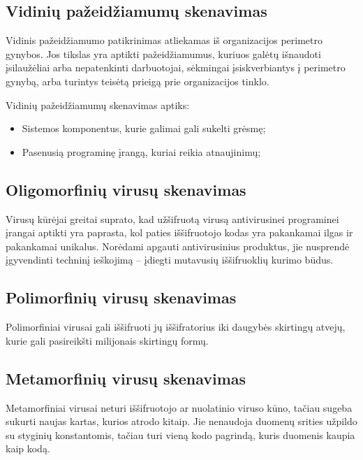 \documentclass[a4paper,12pt,fleqn]{article}
\begin{document}
\subsection{Vidinių pažeidžiamumų skenavimas}
\label{sec:example}

Vidinis pažeidžiamumo patikrinimas atliekamas iš organizacijos perimetro gynybos. Jos tikslas yra aptikti pažeidžiamumus, kuriuos galėtų išnaudoti įsilaužėliai arba nepatenkinti darbuotojai, sėkmingai įsiskverbiantys į perimetro gynybą, arba turintys teisėtą prieigą prie organizacijos tinklo\cite{asbjornslett1999assess}.

Vidinių pažeidžiamumų skenavimas aptiks:
\begin{itemize}
	\item Sistemos komponentus, kurie galimai gali sukelti grėsmę;
	\item Pasenusią programinę įrangą, kuriai reikia atnaujinimų;
\end{itemize}



\subsection{Oligomorfinių virusų skenavimas}
\label{sec:example}

Virusų kūrėjai greitai suprato, kad užšifruotą virusą antivirusinei programinei įrangai aptikti yra paprasta, kol paties iššifruotojo kodas yra pakankamai ilgas ir pakankamai unikalus. Norėdami apgauti antivirusinius produktus, jie nusprendė įgyvendinti techninį ieškojimą – įdiegti mutavusių iššifruoklių kurimo būdus\cite{Szor:2005:ACV:1050957}. 

\subsection{Polimorfinių virusų skenavimas}
\label{sec:example}

Polimorfiniai virusai gali iššifruoti jų iššifratorius iki daugybės skirtingų atvejų, kurie gali pasireikšti milijonais skirtingų formų\cite{Szor:2005:ACV:1050957}. 

\subsection{Metamorfinių virusų skenavimas}
\label{sec:example}

Metamorfiniai virusai neturi iššifruotojo ar nuolatinio viruso kūno, tačiau sugeba sukurti naujas kartas, kurios atrodo kitaip. Jie nenaudoja duomenų srities užpildo su styginių konstantomis, tačiau turi vieną kodo pagrindą, kuris duomenis kaupia kaip kodą\cite{Szor:2005:ACV:1050957}. 
\end{document}
